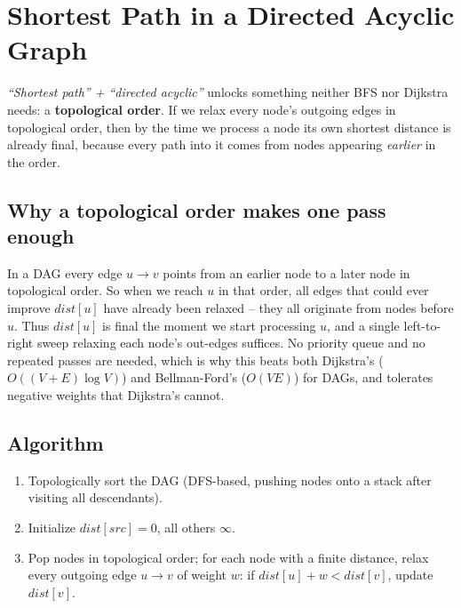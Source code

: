 \section{Shortest Path in a Directed Acyclic Graph}
\label{sec:graph-shortest-path-dag}


\begin{patternbox}
\emph{``Shortest path'' + ``directed acyclic''} unlocks something
neither BFS nor Dijkstra needs: a \textbf{topological order}. If we
relax every node's outgoing edges in topological order, then by the
time we process a node its own shortest distance is already final,
because every path into it comes from nodes appearing \emph{earlier}
in the order.
\end{patternbox}

\subsection*{Why a topological order makes one pass enough}

In a DAG every edge $u \to v$ points from an earlier node to a later
node in topological order. So when we reach $u$ in that order, all
edges that could ever improve $\textit{dist}[u]$ have already been
relaxed -- they all originate from nodes before $u$. Thus
$\textit{dist}[u]$ is final the moment we start processing $u$, and a
single left-to-right sweep relaxing each node's out-edges suffices. No
priority queue and no repeated passes are needed, which is why this
beats both Dijkstra's ($O((V+E)\log V)$) and Bellman-Ford's
($O(VE)$) for DAGs, and tolerates negative weights that Dijkstra's
cannot.

\subsection*{Algorithm}

\begin{enumerate}
  \item Topologically sort the DAG (DFS-based, pushing nodes onto a
        stack after visiting all descendants).
  \item Initialize $\textit{dist}[\textit{src}]=0$, all others
        $\infty$.
  \item Pop nodes in topological order; for each node with a finite
        distance, relax every outgoing edge $u\to v$ of weight $w$: if
        $\textit{dist}[u]+w<\textit{dist}[v]$, update
        $\textit{dist}[v]$.
\end{enumerate}

